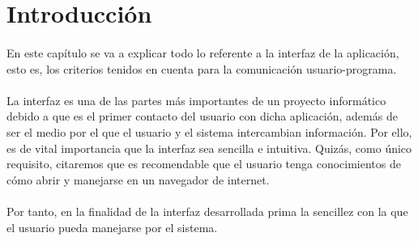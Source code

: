 \section{Introducción}

  \paragraph{}En este capítulo se va a explicar todo lo referente a la interfaz
  de la aplicación, esto es, los criterios tenidos en cuenta para la
  comunicación usuario-programa.

  \paragraph{}La interfaz es una de las partes más importantes de un proyecto
  informático debido a que es el primer contacto del usuario con dicha
  aplicación, además de ser el medio por el que el usuario y el sistema
  intercambian información. Por ello, es de vital importancia que la interfaz
  sea sencilla e intuitiva. Quizás, como único requisito, citaremos que es
  recomendable que el usuario tenga conocimientos de cómo abrir y manejarse en
  un navegador de internet.

  \paragraph{}Por tanto, en la finalidad de la interfaz desarrollada prima la
  sencillez con la que el usuario pueda manejarse por el sistema.